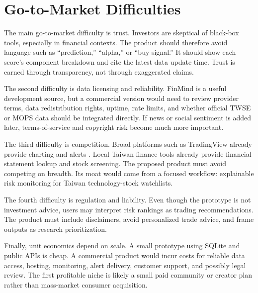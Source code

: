 \section{Go-to-Market Difficulties}
\label{sec:go-to-market}

The main go-to-market difficulty is trust. Investors are skeptical of black-box tools, especially in financial contexts. The product should therefore avoid language such as ``prediction,'' ``alpha,'' or ``buy signal.'' It should show each score's component breakdown and cite the latest data update time. Trust is earned through transparency, not through exaggerated claims.

The second difficulty is data licensing and reliability. FinMind is a useful development source, but a commercial version would need to review provider terms, data redistribution rights, uptime, rate limits, and whether official TWSE or MOPS data should be integrated directly. If news or social sentiment is added later, terms-of-service and copyright risk become much more important.

The third difficulty is competition. Broad platforms such as TradingView already provide charting and alerts \citep{tradingview_pricing}. Local Taiwan finance tools already provide financial statement lookup and stock screening. The proposed product must avoid competing on breadth. Its moat would come from a focused workflow: explainable risk monitoring for Taiwan technology-stock watchlists.

The fourth difficulty is regulation and liability. Even though the prototype is not investment advice, users may interpret risk rankings as trading recommendations. The product must include disclaimers, avoid personalized trade advice, and frame outputs as research prioritization.

Finally, unit economics depend on scale. A small prototype using SQLite and public APIs is cheap. A commercial product would incur costs for reliable data access, hosting, monitoring, alert delivery, customer support, and possibly legal review. The first profitable niche is likely a small paid community or creator plan rather than mass-market consumer acquisition.
